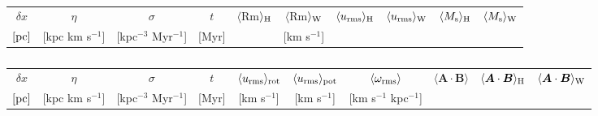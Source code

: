 \documentclass[iop,apj,numberedappendix,twocolappendix]{emulateapj}
\newcommand{\vect}[1]{\boldsymbol{#1}}
\begin{document}

\begin{table}\caption{\label{tab:hot10}}
\begin{tabular}{cccccccccc}
\hline
$\delta x$& $\eta$          & $\sigma$              &$ t$&$\langle$Rm$\rangle_{ \rm H}$&$\langle$Rm$\rangle_{ \rm W}$&$\langle u_{\rm rms}\rangle_{ \rm H}$ &$\langle u_{\rm rms}\rangle_{ \rm W}$ &$\langle M_{\rm s}\rangle_{ \rm H}$ &$\langle M_{\rm s}\rangle_{ \rm W}$\\
$[\rm pc]$&[kpc km s$^{-1}$]&[kpc$^{-3}$ Myr$^{-1}$]&[Myr]   &   &    [km s$^{-1}$]&  &\\  
\hline

\end{tabular}
\end{table}


\begin{table}\caption{\label{tab:rot10}}
\begin{tabular}{cccccccccc}
\hline
$\delta x$& $\eta$          & $\sigma$              &$ t$&$\langle u_{\rm rms}\rangle_{ \rm rot}$&$\langle u_{\rm rms}\rangle_{ \rm pot}$&$\langle \omega_{\rm rms}\rangle$ &$\langle \vect{A}\cdot\vect{B}\rangle$ &$\langle \vect{A}\cdot\vect{B}\rangle_{ \rm H}$ &$\langle \vect{A}\cdot\vect{B}\rangle_{ \rm W}$\\
$[\rm pc]$&[kpc km s$^{-1}$]&[kpc$^{-3}$ Myr$^{-1}$]&[Myr]   & [km s$^{-1}$]  &    [km s$^{-1}$]& [km s$^{-1}$ kpc$^{-1}$] &\\  
\hline

\end{tabular}
\end{table}
\end{document}
